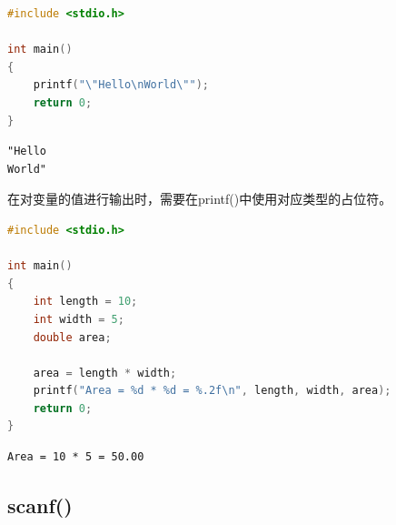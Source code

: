 
\begin{lstlisting}[language=C]
#include <stdio.h>

int main()
{
	printf("\"Hello\nWorld\"");
	return 0;
}
\end{lstlisting}

\begin{tcolorbox}
	\begin{verbatim}
"Hello
World"
	\end{verbatim}
\end{tcolorbox}

在对变量的值进行输出时，需要在printf()中使用对应类型的占位符。\\

\begin{table}[H]
	\centering
	\caption{占位符}
\end{table}

\vspace{0.5cm}


\begin{lstlisting}[language=C]
#include <stdio.h>

int main()
{
	int length = 10;
	int width = 5;
	double area;

	area = length * width;
	printf("Area = %d * %d = %.2f\n", length, width, area);
	return 0;
}
\end{lstlisting}

\begin{tcolorbox}
	\begin{verbatim}
Area = 10 * 5 = 50.00
	\end{verbatim}
\end{tcolorbox}

\vspace{0.5cm}

\subsection{scanf()}

